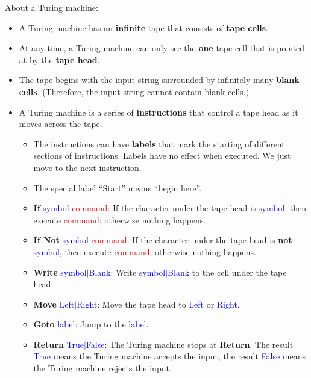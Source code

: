 \documentclass[12pt, letterpaper, oneside]{book}
\begin{document}
About a Turing machine:
\begin{itemize}
  \item A Turing machine has an \textbf{infinite} tape that consists of \textbf{tape cells}.
  \item At any time, a Turing machine can only see the \textbf{one} tape cell that is pointed at by the \textbf{tape
          head}.
  \item The tape begins with the input string surrounded by infinitely many \textbf{blank cells}. (Therefore, the input
        string cannot contain blank cells.)
  \item A Turing machine is a series of \textbf{instructions} that control a tape head as it moves across the tape.
        \begin{itemize}
          \item The instructions can have \textbf{labels} that mark the starting of different sections of instructions.
                Labels have no effect when executed. We just move to the next instruction.
          \item The special label ``Start'' means ``begin here''.
          \item \textbf{If} \textcolor{blue}{symbol} \textcolor{red}{command}: If the character under the tape head is
                \textcolor{blue}{symbol}, then execute \textcolor{red}{command}; otherwise nothing happens.
          \item \textbf{If Not} \textcolor{blue}{symbol} \textcolor{red}{command}: If the character under the tape head
                is \textbf{not} \textcolor{blue}{symbol}, then execute \textcolor{red}{command}; otherwise nothing
                happens.
          \item \textbf{Write} \textcolor{blue}{symbol$|$Blank}: Write \textcolor{blue}{symbol$|$Blank} to the cell
                under the tape head.
          \item \textbf{Move} \textcolor{blue}{Left$|$Right}: Move the tape head to \textcolor{blue}{Left} or
                \textcolor{blue}{Right}.
          \item \textbf{Goto} \textcolor{blue}{label}: Jump to the \textcolor{blue}{label}.
          \item \textbf{Return} \textcolor{blue}{True$|$False}: The Turing machine stops at \textbf{Return}. The result
                \textcolor{blue}{True} means the Turing machine accepts the input; the result \textcolor{blue}{False}
                means the Turing machine rejects the input.
        \end{itemize}
\end{itemize}
\end{document}
